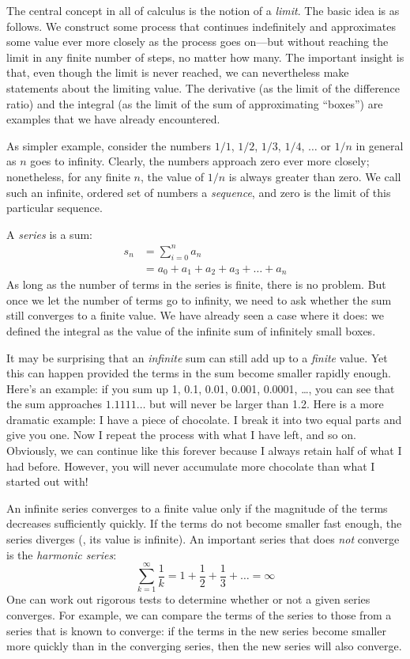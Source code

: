 
The central concept in all of calculus is the notion of a
\emph{limit}. The basic idea is as follows. We construct some process
that continues indefinitely and approximates some value ever more
closely as the process goes on---but without reaching the limit in any
finite number of steps, no matter how many. The important insight is
that, even though the limit is never reached, we can nevertheless make
statements about the limiting value. The derivative (as the limit of
the difference ratio) and the integral (as the limit of the sum of
approximating ``boxes'') are examples that we have already
encountered.

As simpler example, consider the numbers $1/1$, $1/2$, $1/3$, $1/4$,
$\dots$ or $1/n$ in general as $n$ goes to infinity. Clearly, the
numbers approach zero ever more closely; nonetheless, for any finite
$n$, the value of $1/n$ is always greater than zero. We call such an
infinite, ordered set of numbers a \emph{sequence}, and zero is the
limit of this particular sequence.

A \emph{series} is a sum:
%
\begin{align*}
s_n & = \sum_{i=0}^n a_n \\
    & = a_0 + a_1 + a_2 + a_3 + \dots + a_n
\end{align*}
%
As long as the number of terms in the series is finite, there is no
problem. But once we let the number of terms go to infinity, we need
to ask whether the sum still converges to a finite value. We have
already seen a case where it does: we defined the integral as the
value of the infinite sum of infinitely small boxes.

It may be surprising that an \emph{infinite} sum can still add up to a
\emph{finite} value. Yet this can happen provided the terms in the sum
become smaller rapidly enough. Here's an example: if you sum up 1,
0.1, 0.01, 0.001, 0.0001, \dots, you can see that the sum approaches
$1.1111\dotsc$ but will never be larger than 1.2.  Here is a more
dramatic example: I have a piece of chocolate. I break it into two
equal parts and give you one. Now I repeat the process with what I
have left, and so on. Obviously, we can continue like this forever
because I always retain half of what I had before. However, you will
never accumulate more chocolate than what I started out with!

An infinite series converges to a finite value only if the magnitude
of the terms decreases sufficiently quickly. If the terms do not become
smaller fast enough, the series diverges (\ie, its value is infinite).
An important series that does \emph{not} converge is the
\emph{harmonic series}:
%
\[
\sum_{k=1}^\infty \frac{1}{k} 
= 1 + \frac{1}{2} + \frac{1}{3} + \dots = \infty
\]
%
One can work out rigorous tests to determine whether or not a given
series converges. For example, we can compare the terms of the series
to those from a series that is known to converge: if the terms in the
new series become smaller more quickly than in the converging series,
then the new series will also converge.

